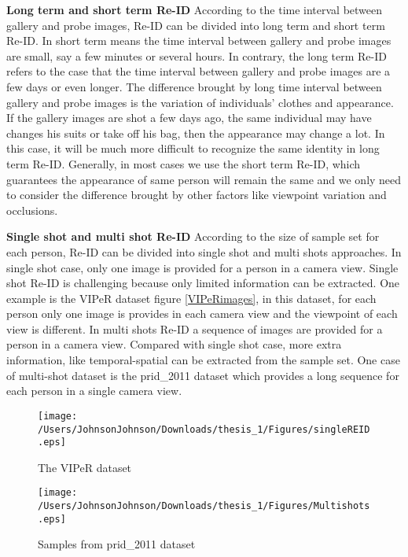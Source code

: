 \textbf{Long term and short term Re-ID} According to the time interval between gallery and probe images, Re-ID can be divided into long term and short term Re-ID.  In short term means the time interval between gallery and probe images are small, say a few minutes or several hours. In contrary, the long term Re-ID refers to the case that the time interval between gallery and probe images are a few days or even longer. The difference brought by long time interval between gallery and probe images is the variation of individuals' clothes and appearance. If the gallery images are shot a few days ago, the same individual may have changes his suits or take off his bag, then the appearance may change a lot. In this case, it will be much more difficult to recognize the same identity in long term Re-ID. Generally, in most cases we use the short term Re-ID, which guarantees the appearance of same person will remain the same and we only need to consider the difference brought by other factors like viewpoint variation and occlusions.


\textbf{Single shot and multi shot Re-ID} According to the size of sample set for each person, Re-ID can be divided into single shot and multi shots approaches. In single shot case, only one image is provided for a person in a camera view. Single shot Re-ID is challenging because only limited information can be extracted. One example is the VIPeR dataset figure \ref{VIPeRimages}, in this dataset, for each person only one image is provides in each camera view and the viewpoint of each view is different. In multi shots Re-ID a sequence of images are provided for a person in a camera view. Compared with single shot case, more extra information, like temporal-spatial can be extracted from the sample set. One case of multi-shot dataset is the prid\_2011 dataset which provides a long sequence for each person in a single camera view.

\begin{figure}[H]

\texttt{[image: /Users/JohnsonJohnson/Downloads/thesis\_1/Figures/singleREID.eps]}
\vspace{-3em}
\caption{The VIPeR dataset}
\end{figure}
\label{VIPeRimages}

\begin{figure}[H]

\texttt{[image: /Users/JohnsonJohnson/Downloads/thesis\_1/Figures/Multishots.eps]}
\vspace{-3em}
\caption{Samples from prid\_2011 dataset}

\end{figure}



